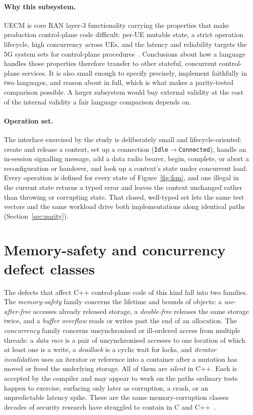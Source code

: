 \paragraph{Why this subsystem.}
UECM is core RAN layer-3 functionality carrying the properties that make production
control-plane code difficult: per-UE mutable state, a strict operation lifecycle, high
concurrency across UEs, and the latency and reliability targets the 5G system sets for
control-plane procedures~\cite{3gpp38913,3gpp22261}. Conclusions about how a language handles
those properties therefore transfer to other stateful, concurrent control-plane services. It is
also small enough to specify precisely, implement faithfully in two languages, and reason about
in full, which is what makes a parity-tested comparison possible. A larger subsystem would buy
external validity at the cost of the internal validity a fair language comparison depends on.

\paragraph{Operation set.}
The interface exercised by the study is deliberately small and lifecycle-oriented: create and
release a context, set up a connection (\texttt{Idle}$\rightarrow$\texttt{Connected}), handle an
in-session signalling message, add a data radio bearer, begin, complete, or abort a
reconfiguration or handover, and look up a context's state under concurrent load. Every
operation is defined for every state of Figure~\ref{fig:fsm}, and one illegal in the current
state returns a typed error and leaves the context unchanged rather than throwing or corrupting
state. That closed, well-typed set lets the same test vectors and the same workload drive both
implementations along identical paths (Section~\ref{sec:parity}).

\section{Memory-safety and concurrency defect classes}\label{sec:defects}
The defects that affect C++ control-plane code of this kind fall into two families. The
\emph{memory-safety} family concerns the lifetime and bounds of objects: a \emph{use-after-free}
accesses already released storage, a \emph{double-free} releases the same storage twice, and a
\emph{buffer overflow} reads or writes past the end of an allocation. The \emph{concurrency}
family concerns unsynchronised or ill-ordered access from multiple threads: a \emph{data race}
is a pair of unsynchronised accesses to one location of which at least one is a write, a
\emph{deadlock} is a cyclic wait for locks, and \emph{iterator invalidation} uses an iterator or
reference into a container after a mutation has moved or freed the underlying storage. All of
them are \emph{silent} in C++. Each is accepted by the compiler and may appear to work on the
paths ordinary tests happen to exercise, surfacing only later as corruption, a crash, or an
unpredictable latency spike. These are the same memory-corruption classes decades of security
research have struggled to contain in C and C++~\cite{szekeres2013sok}.

